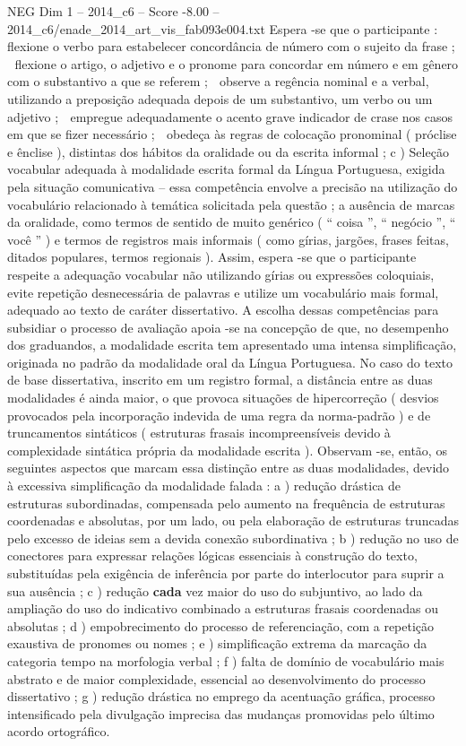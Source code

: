 \begin{textsample}{NEG Dim 1 – 2014\_c6 – Score -8.00 – 2014\_c6/enade\_2014\_art\_vis\_fab093e004.txt}
Espera -se que o participante :  flexione o verbo para estabelecer concordância de número com o sujeito da frase ;  flexione o artigo, o adjetivo e o pronome para concordar em número e em gênero com o substantivo a que se referem ;  observe a regência nominal e a verbal, utilizando a preposição adequada depois de um substantivo, um verbo ou um adjetivo ;  empregue adequadamente o acento grave indicador de crase nos casos em que se fizer necessário ;  obedeça às regras de colocação pronominal ( próclise e ênclise ), distintas dos hábitos da oralidade ou da escrita informal ; c ) Seleção vocabular adequada à modalidade escrita formal da Língua Portuguesa, exigida pela situação comunicativa – essa competência envolve a precisão na utilização do vocabulário relacionado à temática solicitada pela questão ; a ausência de marcas da oralidade, como termos de sentido de muito genérico ( “ coisa ”, “ negócio ”, “ você ” ) e termos de registros mais informais ( como gírias, jargões, frases feitas, ditados populares, termos regionais ).
Assim, espera -se que o participante respeite a adequação vocabular não utilizando gírias ou expressões coloquiais, evite repetição desnecessária de palavras e utilize um vocabulário mais formal, adequado ao texto de caráter dissertativo.
A escolha dessas competências para subsidiar o processo de avaliação apoia -se na concepção de que, no desempenho dos graduandos, a modalidade escrita tem apresentado uma intensa simplificação, originada no padrão da modalidade oral da Língua Portuguesa.
No caso do texto de base dissertativa, inscrito em um registro formal, a distância entre as duas modalidades é ainda maior, o que provoca situações de hipercorreção ( desvios provocados pela incorporação indevida de uma regra da norma-padrão ) e de truncamentos sintáticos ( estruturas frasais incompreensíveis devido à complexidade sintática própria da modalidade escrita ).
Observam -se, então, os seguintes aspectos que marcam essa distinção entre as duas modalidades, devido à excessiva simplificação da modalidade falada : a ) redução drástica de estruturas subordinadas, compensada pelo aumento na frequência de estruturas coordenadas e absolutas, por um lado, ou pela elaboração de estruturas truncadas pelo excesso de ideias sem a devida conexão subordinativa ; b ) redução no uso de conectores para expressar relações lógicas essenciais à construção do texto, substituídas pela exigência de inferência por parte do interlocutor para suprir a sua ausência ; c ) redução \textbf{cada} vez maior do uso do subjuntivo, ao lado da ampliação do uso do indicativo combinado a estruturas frasais coordenadas ou absolutas ; d ) empobrecimento do processo de referenciação, com a repetição exaustiva de pronomes ou nomes ; e ) simplificação extrema da marcação da categoria tempo na morfologia verbal ; f ) falta de domínio de vocabulário mais abstrato e de maior complexidade, essencial ao desenvolvimento do processo dissertativo ; g ) redução drástica no emprego da acentuação gráfica, processo intensificado pela divulgação imprecisa das mudanças promovidas pelo último acordo ortográfico.

\end{textsample}
